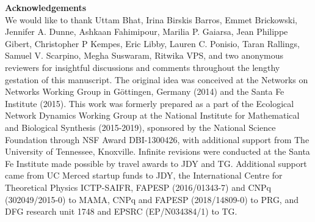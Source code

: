 \documentclass[twocolumn,preprintnumbers,amsmath,amssymb,superscriptaddress,linenumbers]{revtex4-1}
\providecommand{\DIFaddbegin}{} %
\providecommand{\DIFaddend}{} %
\providecommand{\DIFdelbegin}{} %
\providecommand{\DIFdelend}{} %
\newcommand{\DIFscaledelfig}{0.5}
\newlength{\DIFdelgraphicswidth} %
\newlength{\DIFdelgraphicsheight} %
\newcommand{\DIFaddincludegraphics}[2][]{{\color{blue}\fbox{\DIFOincludegraphics[#1]{#2}}}} %
\newcommand{\DIFdelincludegraphics}[2][]{%
\sbox{\DIFdelgraphicsbox}{\DIFOincludegraphics[#1]{#2}}%
\settoboxwidth{\DIFdelgraphicswidth}{\DIFdelgraphicsbox} %
\settoboxtotalheight{\DIFdelgraphicsheight}{\DIFdelgraphicsbox} %
\scalebox{\DIFscaledelfig}{%
\parbox[b]{\DIFdelgraphicswidth}{\usebox{\DIFdelgraphicsbox}\\[-\baselineskip] \rule{\DIFdelgraphicswidth}{0em}}\llap{\resizebox{\DIFdelgraphicswidth}{\DIFdelgraphicsheight}{%
\setlength{\unitlength}{\DIFdelgraphicswidth}%
\begin{picture}(1,1)%
\thicklines\linethickness{2pt} %
{\color[rgb]{1,0,0}\put(0,0){\framebox(1,1){}}}%
{\color[rgb]{1,0,0}\put(0,0){\line( 1,1){1}}}%
{\color[rgb]{1,0,0}\put(0,1){\line(1,-1){1}}}%
\end{picture}%
}\hspace*{3pt}}} %
} %
\DeclareRobustCommand{\DIFaddbegin}{\DIFOaddbegin \let\includegraphics\DIFaddincludegraphics} %
\DeclareRobustCommand{\DIFaddend}{\DIFOaddend \let\includegraphics\DIFOincludegraphics} %
\DeclareRobustCommand{\DIFdelbegin}{\DIFOdelbegin \let\includegraphics\DIFdelincludegraphics} %
\DeclareRobustCommand{\DIFdelend}{\DIFOaddend \let\includegraphics\DIFOincludegraphics} %
\begin{document}

\DIFdelbegin %
\DIFdelend \DIFaddbegin 
\DIFaddend 


\vspace{2mm}
\noindent \textbf{Acknowledgements}\\
  \footnotesize{
  We would like to thank
  Uttam Bhat,
  Irina Birskis Barros,
  Emmet Brickowski,
  Jennifer A. Dunne,
  Ashkaan Fahimipour,
  Marilia P. Gaiarsa,
  Jean Philippe Gibert,
  Christopher P Kempes,
  Eric Libby,
  Lauren C. Ponisio,
  Taran Rallings,
  Samuel V. Scarpino,
  Megha Suswaram,
  Ritwika VPS,
  and two anonymous reviewers
  for insightful discussions and comments throughout the lengthy gestation of this manuscript.
  The original idea was conceived at the Networks on Networks Working Group in G\"ottingen, Germany (2014) and the Santa Fe Institute (2015).
  This work was formerly prepared as a part of the Ecological Network Dynamics Working Group at the National Institute for Mathematical and Biological Synthesis (2015-2019), sponsored by the National Science Foundation through NSF Award DBI-1300426, with additional support from The University of Tennessee, Knoxville.
  Infinite revisions were conducted at the Santa Fe Institute made possible by travel awards to JDY and TG.
  Additional support came from UC Merced startup funds to JDY, the International Centre for Theoretical Physics ICTP-SAIFR, FAPESP (2016/01343-7) and CNPq (302049/2015-0) to MAMA, CNPq and FAPESP (2018/14809-0) to PRG, and DFG research unit 1748 and EPSRC (EP/N034384/1) to TG.
  }\\ \\
\end{document}
